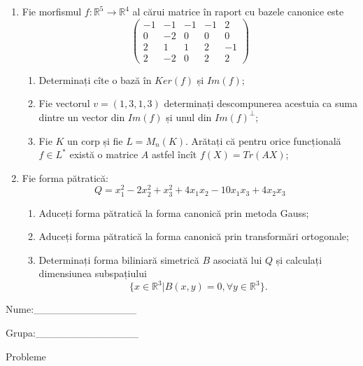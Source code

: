 \documentclass{article}
\begin{document}
\begin{enumerate}
 \item Fie morfismul $f:\mathbb{R}^5 \to \mathbb{R}^4$ al cărui matrice în raport cu bazele canonice este
$$\begin{pmatrix}
-1&-1&-1&-1&2\\
0&-2&0&0&0\\
2&1&1&2&-1\\
2&-2&0&2&2
\end{pmatrix}$$

\begin{enumerate}
\item Determinați cîte o bază în $Ker(f)$ și $Im(f)$;
\item Fie vectorul $v=(1,3,1,3)$ determinați descompunerea acestuia ca suma dintre un vector din $Im(f)$ și unul din $Im(f)^\perp$;
\item Fie $K$ un corp și fie $L=M_n(K)$. Arătați că pentru orice funcțională $f \in L^*$ există o matrice $A$ astfel încît $f(X)=Tr(AX)$;
\end{enumerate}
\item Fie forma pătratică:
$$Q= x_1^2-2x_2^2+x_3^2+4x_1x_2-10x_1x_3+4x_2x_3$$

\begin{enumerate}
\item Aduceți forma pătratică la forma canonică prin metoda Gauss;
\item Aduceți forma pătratică la forma canonică prin transformări ortogonale;
\item Determinați forma biliniară simetrică $B$ asociată lui $Q$ și calculați dimensiunea subspațiului
$$\{x \in \mathbb{R}^3 | B(x,y)=0,\forall y \in \mathbb{R}^3\}.$$

\end{enumerate}
\end{enumerate}
\newpage
\begin{flushright}
Nume:\_\_\_\_\_\_\_\_\_\_\_\_\_\_
 
 
Grupa:\_\_\_\_\_\_\_\_\_\_\_\_\_\_
\end{flushright}
\begin{center}
\vspace{2cm}
{\Large Probleme}
\vspace{2cm}
\end{center}
\end{document}
